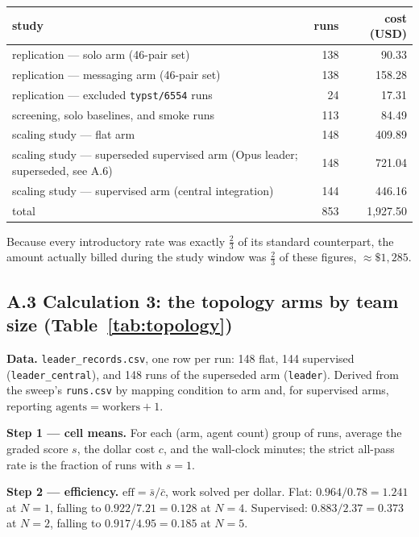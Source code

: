 \documentclass[11pt,a4paper]{article}
\begin{document}
\begin{center}
\begin{tabular}{lrr}
\hline
study & runs & cost (USD) \\
\hline
replication --- solo arm (46-pair set) & 138 & 90.33 \\
replication --- messaging arm (46-pair set) & 138 & 158.28 \\
replication --- excluded \texttt{typst/6554} runs & 24 & 17.31 \\
screening, solo baselines, and smoke runs & 113 & 84.49 \\
scaling study --- flat arm & 148 & 409.89 \\
scaling study --- superseded supervised arm (Opus leader; superseded, see A.6) & 148 & 721.04 \\
scaling study --- supervised arm (central integration) & 144 & 446.16 \\
\hline
total & 853 & 1{,}927.50 \\
\hline
\end{tabular}
\end{center}

Because every introductory rate was exactly $\tfrac{2}{3}$ of its standard counterpart, the amount actually billed during the study window was $\tfrac{2}{3}$ of these figures, ${\approx}\$1{,}285$.

\subsection*{A.3 \quad Calculation 3: the topology arms by team size (Table~\ref{tab:topology})}

\textbf{Data.} \texttt{leader\_records.csv}, one row per run: 148 flat, 144 supervised (\texttt{leader\_central}), and 148 runs of the superseded arm (\texttt{leader}). Derived from the sweep's \texttt{runs.csv} by mapping condition to arm and, for supervised arms, reporting $\text{agents} = \text{workers} + 1$.

\textbf{Step 1 --- cell means.} For each (arm, agent count) group of runs, average the graded score $s$, the dollar cost $c$, and the wall-clock minutes; the strict all-pass rate is the fraction of runs with $s = 1$.

\textbf{Step 2 --- efficiency.} $\text{eff} = \bar{s} / \bar{c}$, work solved per dollar. Flat: $0.964/0.78 = 1.241$ at $N=1$, falling to $0.922/7.21 = 0.128$ at $N=4$. Supervised: $0.883/2.37 = 0.373$ at $N=2$, falling to $0.917/4.95 = 0.185$ at $N=5$.
\end{document}
